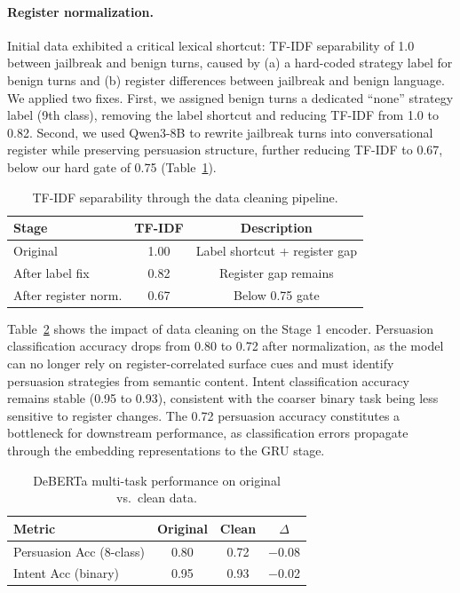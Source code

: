 \documentclass[11pt,a4paper]{article}
\begin{document}
\paragraph{Register normalization.}
Initial data exhibited a critical lexical shortcut: TF-IDF separability of 1.0 between jailbreak and benign turns, caused by (a) a hard-coded strategy label for benign turns and (b) register differences between jailbreak and benign language.
We applied two fixes.
First, we assigned benign turns a dedicated ``none'' strategy label (9th class), removing the label shortcut and reducing TF-IDF from 1.0 to 0.82.
Second, we used Qwen3-8B to rewrite jailbreak turns into conversational register while preserving persuasion structure, further reducing TF-IDF to 0.67, below our hard gate of 0.75 (Table~\ref{tab:tfidf}).

\begin{table}[t]
\centering
\small
\caption{TF-IDF separability through the data cleaning pipeline.}
\label{tab:tfidf}
\begin{tabular}{lcc}
\toprule
\textbf{Stage} & \textbf{TF-IDF} & \textbf{Description} \\
\midrule
Original & 1.00 & Label shortcut + register gap \\
After label fix & 0.82 & Register gap remains \\
After register norm. & 0.67 & Below 0.75 gate \\
\bottomrule
\end{tabular}
\end{table}

Table~\ref{tab:deberta_clean} shows the impact of data cleaning on the Stage 1 encoder.
Persuasion classification accuracy drops from 0.80 to 0.72 after normalization, as the model can no longer rely on register-correlated surface cues and must identify persuasion strategies from semantic content.
Intent classification accuracy remains stable (0.95 to 0.93), consistent with the coarser binary task being less sensitive to register changes.
The 0.72 persuasion accuracy constitutes a bottleneck for downstream performance, as classification errors propagate through the embedding representations to the GRU stage.

\begin{table}[t]
\centering
\small
\caption{DeBERTa multi-task performance on original vs.\ clean data.}
\label{tab:deberta_clean}
\begin{tabular}{lccc}
\toprule
\textbf{Metric} & \textbf{Original} & \textbf{Clean} & \textbf{$\Delta$} \\
\midrule
Persuasion Acc (8-class) & 0.80 & 0.72 & $-$0.08 \\
Intent Acc (binary) & 0.95 & 0.93 & $-$0.02 \\
\bottomrule
\end{tabular}
\end{table}
\end{document}
